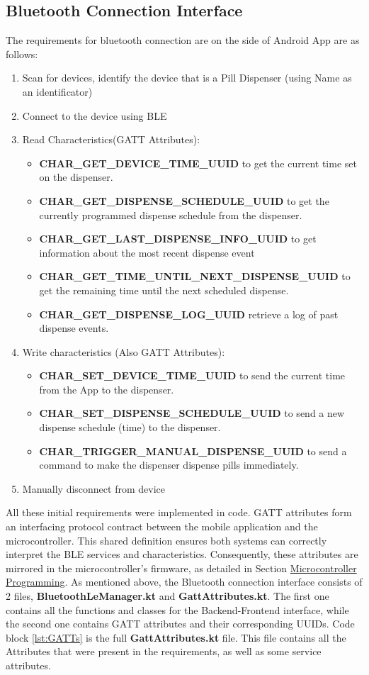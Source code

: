 \subsection{Bluetooth Connection Interface}\label{subsec:Bluetooth}
The requirements for bluetooth connection are on the side of Android App are as follows:
\begin{enumerate}
	\item Scan for devices, identify the device that is a Pill Dispenser (using Name as an identificator)
	\item Connect to the device using \ac{BLE}
	\item Read Characteristics(\ac{GATT} Attributes): 
	\begin{itemize}
		\item \textbf{CHAR\_GET\_DEVICE\_TIME\_UUID} to get the current time set on the dispenser.
		\item \textbf{CHAR\_GET\_DISPENSE\_SCHEDULE\_UUID} to get the currently programmed dispense schedule from the dispenser.
		\item \textbf{CHAR\_GET\_LAST\_DISPENSE\_INFO\_UUID} to get information about the most recent dispense event
		\item \textbf{CHAR\_GET\_TIME\_UNTIL\_NEXT\_DISPENSE\_UUID} to get the remaining time until the next scheduled dispense.
		\item \textbf{CHAR\_GET\_DISPENSE\_LOG\_UUID} retrieve a log of past dispense events.
	\end{itemize}
	\item Write characteristics (Also \ac{GATT} Attributes):
	\begin{itemize}
		\item \textbf{CHAR\_SET\_DEVICE\_TIME\_UUID} to send the current time from the App to the dispenser.
		\item \textbf{CHAR\_SET\_DISPENSE\_SCHEDULE\_UUID} to send a new dispense schedule (time) to the dispenser.
		\item \textbf{CHAR\_TRIGGER\_MANUAL\_DISPENSE\_UUID} to send a command to make the dispenser dispense pills immediately.
	\end{itemize}
	\item Manually disconnect from device
\end{enumerate}
All these initial requirements were implemented in code. \ac{GATT} attributes form an interfacing protocol contract between the mobile application and the microcontroller. This shared definition ensures both systems can correctly interpret the \ac{BLE} services and characteristics. Consequently, these attributes are mirrored in the microcontroller's firmware, as detailed in Section  \hyperref[sec:Backenddev]{Microcontroller Programming}. As mentioned above, the Bluetooth connection interface consists of 2 files, \textbf{BluetoothLeManager.kt} and \textbf{GattAttributes.kt}. The first one contains all the functions and classes for the Backend-Frontend interface, while the second one contains \ac{GATT} attributes and their corresponding \ac{UUID}s. Code block \ref{lst:GATTs} is the full \textbf{GattAttributes.kt} file. This file contains all the Attributes that were present in the requirements, as well as some service attributes.
